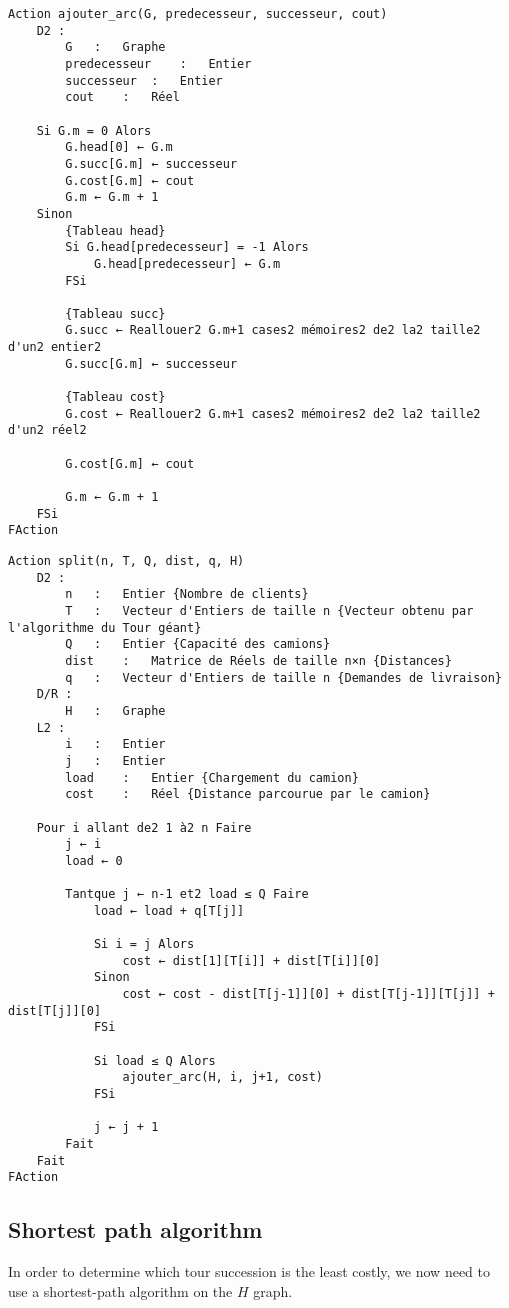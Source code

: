 \begin{lstlisting}[language=pseudo, caption={Ajout d'un arc}, label=ajouter_arc]
Action ajouter_arc(G, predecesseur, successeur, cout)
    D2 :
        G   :   Graphe
        predecesseur    :   Entier
        successeur  :   Entier
        cout    :   Réel
    
    Si G.m = 0 Alors
		G.head[0] ← G.m
		G.succ[G.m] ← successeur
		G.cost[G.m] ← cout
		G.m ← G.m + 1
    Sinon
		{Tableau head}
		Si G.head[predecesseur] = -1 Alors
			G.head[predecesseur] ← G.m
		FSi

		{Tableau succ}
		G.succ ← Reallouer2 G.m+1 cases2 mémoires2 de2 la2 taille2 d'un2 entier2
		G.succ[G.m] ← successeur		

		{Tableau cost}
		G.cost ← Reallouer2 G.m+1 cases2 mémoires2 de2 la2 taille2 d'un2 réel2
		
		G.cost[G.m] ← cout

		G.m ← G.m + 1
	FSi
FAction
\end{lstlisting}

\begin{lstlisting}[language=pseudo, caption={Procédure de découpage}, label=split]
Action split(n, T, Q, dist, q, H)
	D2 :
		n	:	Entier {Nombre de clients}
		T	:	Vecteur d'Entiers de taille n {Vecteur obtenu par l'algorithme du Tour géant}
		Q	:	Entier {Capacité des camions}
		dist	:	Matrice de Réels de taille n×n {Distances}
		q	:	Vecteur d'Entiers de taille n {Demandes de livraison}
	D/R :
		H	:	Graphe
	L2 :
		i	:	Entier
		j	:	Entier
		load	:	Entier {Chargement du camion}
		cost	:	Réel {Distance parcourue par le camion}

	Pour i allant de2 1 à2 n Faire
		j ← i
		load ← 0

		Tantque j ← n-1 et2 load ≤ Q Faire
			load ← load + q[T[j]]

			Si i = j Alors
				cost ← dist[1][T[i]] + dist[T[i]][0]
			Sinon
				cost ← cost - dist[T[j-1]][0] + dist[T[j-1]][T[j]] + dist[T[j]][0]
			FSi

			Si load ≤ Q Alors
				ajouter_arc(H, i, j+1, cost)
			FSi

			j ← j + 1
		Fait
	Fait
FAction
\end{lstlisting}

\subsection{Shortest path algorithm}

In order to determine which tour succession is the least costly, we now need to use a shortest-path algorithm on the $H$ graph.

